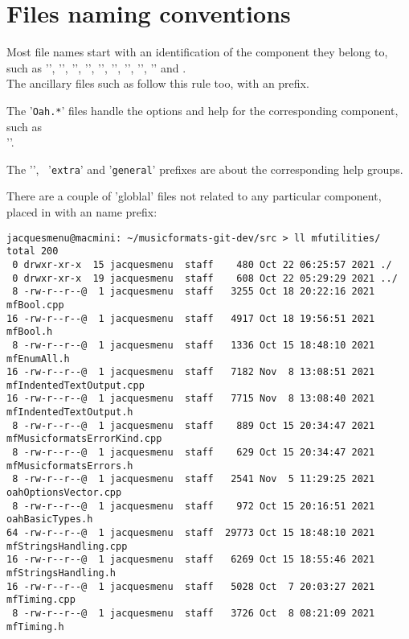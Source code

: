 \section{Files naming conventions}

Most file names start with an identification of the component they belong to, such as '', '', '', '', '', '', '', '', '' and .\\
The ancillary files such as  follow this rule too, with an  prefix.

The '{\tt *Oah.*}' files handle the options and help for the corresponding component, such as\\ ''.

The '', \, '{\tt extra}' and '{\tt general}' prefixes are about the corresponding help groups.

There are a couple of 'globlal' files not related to any particular component, placed in \mfutilities{} with an  name prefix:
\begin{lstlisting}[language=Terminal]
jacquesmenu@macmini: ~/musicformats-git-dev/src > ll mfutilities/
total 200
 0 drwxr-xr-x  15 jacquesmenu  staff    480 Oct 22 06:25:57 2021 ./
 0 drwxr-xr-x  19 jacquesmenu  staff    608 Oct 22 05:29:29 2021 ../
 8 -rw-r--r--@  1 jacquesmenu  staff   3255 Oct 18 20:22:16 2021 mfBool.cpp
16 -rw-r--r--@  1 jacquesmenu  staff   4917 Oct 18 19:56:51 2021 mfBool.h
 8 -rw-r--r--@  1 jacquesmenu  staff   1336 Oct 15 18:48:10 2021 mfEnumAll.h
16 -rw-r--r--@  1 jacquesmenu  staff   7182 Nov  8 13:08:51 2021 mfIndentedTextOutput.cpp
16 -rw-r--r--@  1 jacquesmenu  staff   7715 Nov  8 13:08:40 2021 mfIndentedTextOutput.h
 8 -rw-r--r--@  1 jacquesmenu  staff    889 Oct 15 20:34:47 2021 mfMusicformatsErrorKind.cpp
 8 -rw-r--r--@  1 jacquesmenu  staff    629 Oct 15 20:34:47 2021 mfMusicformatsErrors.h
 8 -rw-r--r--@  1 jacquesmenu  staff   2541 Nov  5 11:29:25 2021 oahOptionsVector.cpp
 8 -rw-r--r--@  1 jacquesmenu  staff    972 Oct 15 20:16:51 2021 oahBasicTypes.h
64 -rw-r--r--@  1 jacquesmenu  staff  29773 Oct 15 18:48:10 2021 mfStringsHandling.cpp
16 -rw-r--r--@  1 jacquesmenu  staff   6269 Oct 15 18:55:46 2021 mfStringsHandling.h
16 -rw-r--r--@  1 jacquesmenu  staff   5028 Oct  7 20:03:27 2021 mfTiming.cpp
 8 -rw-r--r--@  1 jacquesmenu  staff   3726 Oct  8 08:21:09 2021 mfTiming.h
\end{lstlisting}

